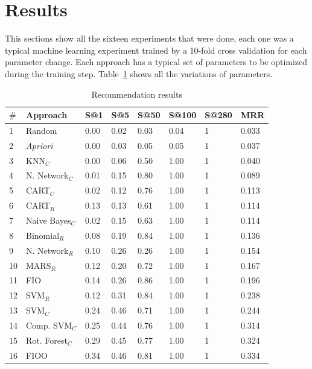 \documentclass{RITA}
\begin{document}
\section{Results}
This sections show all the sixteen experiments that were done, each one was a typical machine learning experiment trained by a 10-fold cross validation for each parameter change. Each approach has a typical set of parameters to be optimized during the training step. Table~\ref{tb_parametros} shows all the variations of parameters.
\bgroup
\begin{table}[!htp]
	\begin{center}
		\caption{Recommendation results}
		\label{tb_parametros}
		\begin{tabular}{llllllll} \hline
			\tiny
			\textbf{\(\mathbf{\#}\)} & \textbf{Approach}&\textbf{S@1}&\textbf{S@5} & \textbf{S@50} & \textbf{S@100} & \textbf{S@280} & \textbf{MRR} \\ \hline
			1  & Random					& 0.00 & 0.02 & 0.03 & 0.04 & 1 & 0.033 \\
			2  & \emph{Apriori}			& 0.00 & 0.03 & 0.05 & 0.05 & 1 & 0.037 \\ 
			3  & KNN\(_C\)				& 0.00 & 0.06 & 0.50 & 1.00 & 1 & 0.040 \\ 			
			4  & N. Network\(_C\)		& 0.01 & 0.15 & 0.80 & 1.00 & 1 & 0.089 \\ 
			5  & CART\(_C\)				& 0.02 & 0.12 & 0.76 & 1.00 & 1 & 0.113 \\ 
			6  & CART\(_R\)    			& 0.13 & 0.13 & 0.61 & 1.00 & 1 & 0.114 \\ 
			7  & Naive Bayes\(_C\)     	& 0.02 & 0.15 & 0.63 & 1.00 & 1 & 0.114 \\ 
			8  & Binomial\(_R\) 		& 0.08 & 0.19 & 0.84 & 1.00 & 1 & 0.136 \\ 
			9  & N. Network\(_R\)   	& 0.10 & 0.26 & 0.26 & 1.00 & 1 & 0.154 \\ 
			10 & MARS\(_R\)     		& 0.12 & 0.20 & 0.72 & 1.00 & 1 & 0.167 \\ 
			11 & FIO           			& 0.14 & 0.26 & 0.86 & 1.00 & 1 & 0.196 \\ 
			12 & SVM\(_R\)     			& 0.12 & 0.31 & 0.84 & 1.00 & 1 & 0.238 \\ 
			13 & SVM\(_C\)    			& 0.24 & 0.46 & 0.71 & 1.00 & 1 & 0.244 \\ 
			14 & Comp. SVM\(_C\)		& 0.25 & 0.44 & 0.76 & 1.00 & 1 & 0.314 \\ 
			15 & Rot. Forest\(_C\)  	& 0.29 & 0.45 & 0.77 & 1.00 & 1 & 0.324 \\ 
			16 & FIOO          			& 0.34 & 0.46 & 0.81 & 1.00 & 1 & 0.334 \\ \hline
		\end{tabular}
	\end{center}
\end{table}
\egroup
\end{document}
